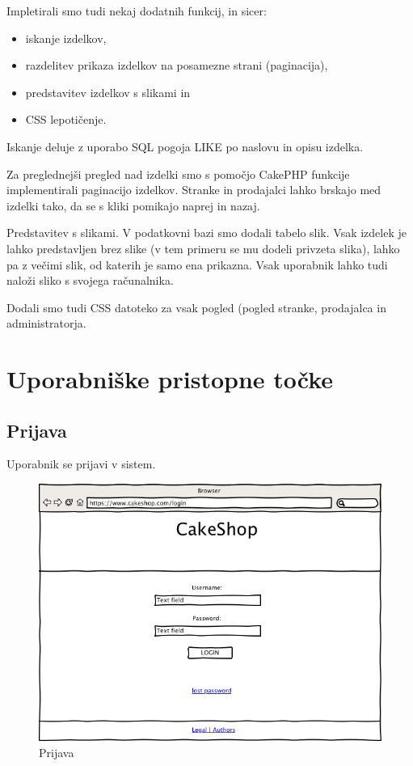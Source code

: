 \documentclass[a4paper,12pt]{report}
\begin{document}
Impletirali smo tudi nekaj dodatnih funkcij, in sicer:

\begin{itemize}
  \item iskanje izdelkov,
  \item razdelitev prikaza izdelkov na posamezne strani (paginacija),
  \item predstavitev izdelkov s slikami in
  \item CSS lepotičenje.
\end{itemize}

Iskanje deluje z uporabo SQL pogoja LIKE po naslovu in opisu izdelka.

Za preglednejši pregled nad izdelki smo s pomočjo CakePHP funkcije implementirali paginacijo izdelkov. Stranke in prodajalci lahko brskajo med izdelki tako, da se s kliki pomikajo naprej in nazaj.

Predstavitev s slikami. V podatkovni bazi smo dodali tabelo slik. Vsak izdelek je lahko predstavljen brez slike (v tem primeru se mu dodeli privzeta slika), lahko pa z večimi slik, od katerih je samo ena prikazna. Vsak uporabnik lahko tudi naloži sliko s svojega računalnika.

Dodali smo tudi CSS datoteko za vsak pogled (pogled stranke, prodajalca in administratorja.

\chapter{Uporabniške pristopne točke}


\section{Prijava}

Uporabnik se prijavi v sistem.

\begin{figure}[htb]
	\centering
	\includegraphics[width=13cm]{Wireframes/cakeshop/pngs/010200-LoginAnonymous.png}
	\caption{Prijava}
\label{fig:1}
\end{figure}
\end{document}
